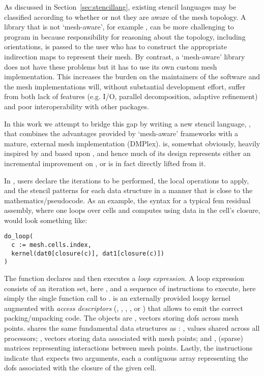As discussed in Section~\ref{sec:stencillang}, existing stencil languages may be classified according to whether or not they are aware of the mesh topology.
A library that is not `mesh-aware', for example , can be more challenging to program in because responsibility for reasoning about the topology, including orientations, is passed to the user who has to construct the appropriate indirection maps to represent their mesh.
By contrast, a `mesh-aware' library does not have these problems but it has to use its own custom mesh implementation.
This increases the burden on the maintainers of the software and the mesh implementations will, without substantial development effort, suffer from both lack of features (e.g. I/O, parallel decomposition, adaptive refinement) and poor interoperability with other packages.

In this work we attempt to bridge this gap by writing a new stencil language, , that combines the advantages provided by `mesh-aware' frameworks with a mature, external mesh implementation (DMPlex).
 is, somewhat obviously, heavily inspired by and based upon , and hence much of its design represents either an incremental improvement on , or is in fact directly lifted from it.

In , users declare the iterations to be performed, the local operations to apply, and the stencil patterns for each data structure in a manner that is close to the mathematics/pseudocode.
As an example, the syntax for a typical \gls{fem} residual assembly, where one loops over cells and computes using data in the cell's closure, would look something like:

\begin{verbatim}
do_loop(
  c := mesh.cells.index,
  kernel(dat0[closure(c)], dat1[closure(c)])
)
\end{verbatim}

The function  declares and then executes a \textit{loop expression}.
A loop expression consists of an iteration set, here , and a sequence of instructions to execute, here simply the single function call to .
 is an externally provided loopy kernel augmented with \textit{access descriptors} (, , , ,  or ) that allows  to emit the correct packing/unpacking code.
The  objects are  , vectors storing \glspl{dof} across mesh points.
 shares the same fundamental data structures as : , values shared across all processors; , vectors storing data associated with mesh points; and , (sparse) matrices representing interactions between mesh points.
Lastly, the  instructions indicate that  expects two arguments, each a contiguous array representing the \glspl{dof} associated with the closure of the given cell.


